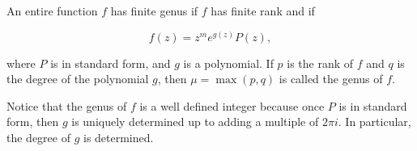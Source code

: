 An entire function $f$ has finite genus if $f$ has finite rank and if

$$f(z) = z^m e^{g(z)} P(z),$$

where $P$ is in standard form, and $g$ is a polynomial. If $p$ is the rank of $f$ and $q$ is the degree of the polynomial $g$, then $\mu = \max (p, q)$ is called the genus of $f$.

Notice that the genus of $f$ is a well defined integer because once $P$ is in standard form, then $g$ is uniquely determined up to adding a multiple of $2\pi i$. In particular, the degree of $g$ is determined.